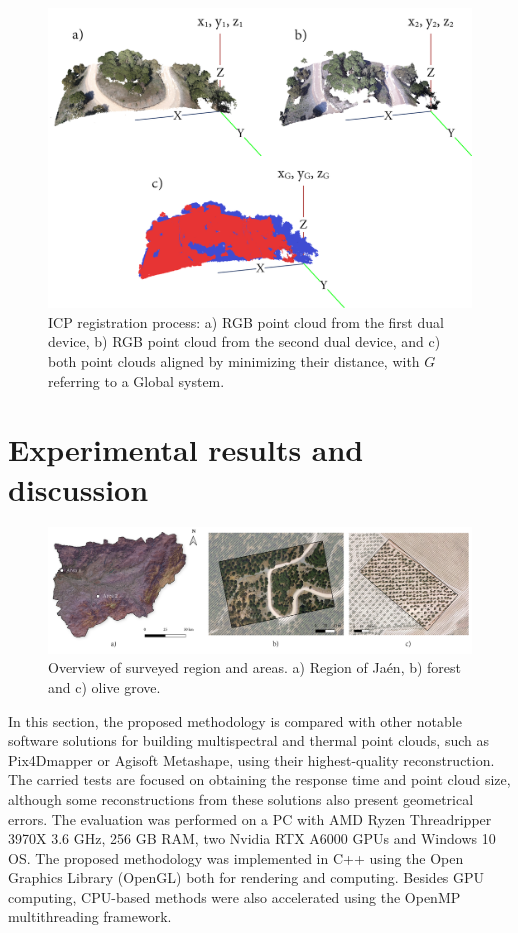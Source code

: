 \begin{figure}[ht]
    \centering
    \includegraphics[width=\linewidth]{figs/multi_thermal_projection/ICP.png}
    \caption{ICP registration process: a) RGB point cloud from the first dual device, b) RGB point cloud from the second dual device, and c) both point clouds aligned by minimizing their distance, with $G$ referring to a Global system.}
    \label{fig:icp}
\end{figure}

\section{Experimental results and discussion}

\begin{figure}
    \centering
    \includegraphics[width=\linewidth]{figs/multi_thermal_projection/study area.png}
    \caption{Overview of surveyed region and areas. a) Region of Jaén, b) forest and c) olive grove.   }
	\label{fig:occlusion_study_area}
\end{figure}

In this section, the proposed methodology is compared with other notable software solutions for building multispectral and thermal point clouds, such as Pix4Dmapper or Agisoft Metashape, using their highest-quality reconstruction. The carried tests are focused on obtaining the response time and point cloud size, although some reconstructions from these solutions also present geometrical errors. The evaluation was performed on a PC with AMD Ryzen Threadripper 3970X 3.6 GHz, 256 GB RAM, two Nvidia RTX A6000 GPUs and Windows 10 OS. The proposed methodology was implemented in C++ using the Open Graphics Library (OpenGL) both for rendering and computing. Besides GPU computing, CPU-based methods were also accelerated using the OpenMP multithreading framework.

